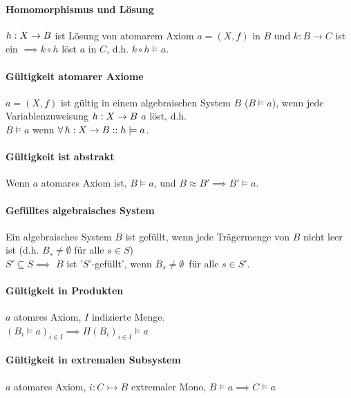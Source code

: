 \paragraph{ Homomorphismus und Lösung}

$h: X \rightarrow B$ ist Lösung von atomarem Axiom $a = (X,f)$ in $B$ und $k: B \rightarrow C$ ist ein \homo $\implies k \circ h$ löst $a$ in $C$, d.h. $k \circ h \models a$.


\paragraph{ Gültigkeit atomarer Axiome}

$a= (X,f) $ ist gültig in einem algebraischen System $B$ ($B \models a$), wenn jede Variablenzuweisung $h: X \rightarrow B$ $a$ löst, d.h. \\
$B \models a$ wenn $\forall \, h: X \rightarrow B :: h \models a$.

\paragraph{ Gültigkeit ist abstrakt}
Wenn $a$ atomares Axiom ist, $B \models a$, und $B \approx B' \implies B' \models a$.  

\paragraph{ Gefülltes algebraisches System}
Ein  algebraisches System $B$ ist gefüllt, wenn jede Trägermenge von $B$ nicht leer ist (d.h. 
$B_s \neq \emptyset$ für alle $s \in S$) \\ $S' \subseteq S \implies$ $B$ ist '$S'$-gefüllt', wenn $B_{s} \neq \emptyset \,$ für alle $s \in S'$.  

\paragraph{ Gültigkeit in Produkten}
$a$ atomres Axiom, $I$ indizierte Menge. \\$(B_i \models a)_{i \in I} \implies \Pi(B_i)_{i \in I} \models a$


\paragraph{ Gültigkeit in extremalen Subsystem}
$a$ atomares Axiom, $i: C \rightarrowtail B$ extremaler Mono, $B \models a \implies C \models a$

